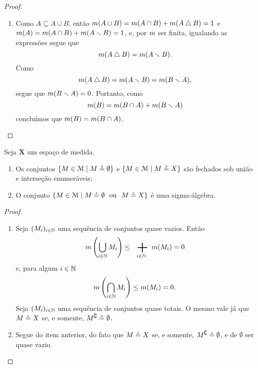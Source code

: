 \begin{proof}
\begin{enumerate}
\item Como $A \subseteq A \cup B$, então $m(A \cup B) = m(A \cap B) + m(A \mathbin{\triangle} B) = 1$ e $m(A) = m(A \cap B) + m(A \smallsetminus B) = 1$, e, por $m$ ser finita, igualando as expressões segue que
	\begin{equation*}
	m(A \mathbin{\triangle} B) = m(A \smallsetminus B).
	\end{equation*}
Como 
	\begin{equation*}
	m(A \mathbin{\triangle} B) = m(A \smallsetminus B) = m(B \smallsetminus A),
	\end{equation*}
segue que $m(B \smallsetminus A)=0$. Portanto, como
	\begin{equation*}
	m(B) = m(B \cap A) + m(B \smallsetminus A)
	\end{equation*}
concluímos que $m(B) = m(B \cap A)$.
	\end{enumerate}
\end{proof}

\begin{proposition}
Seja $\bm X$ um espaço de medida.
	\begin{enumerate}
	\item Os conjuntos $\left\{{M \in \mathcal{M}}\;\middle\vert\;{M \circeq \emptyset}\right\}$ e $\left\{{M \in \mathcal{M}}\;\middle\vert\;{M \circeq X}\right\}$ são fechados sob união e interseção enumeráveis;
	\item O conjunto $\left\{{M \in \mathcal{M}}\;\middle\vert\;{M \circeq \emptyset \text{\ \ ou\ \ } M \circeq X}\right\}$ é uma sigma-álgebra.
	\end{enumerate}
\end{proposition}
\begin{proof}
	\begin{enumerate}
	\item Seja $(M_i)_{i \in \mathbb{N}}$ uma sequência de conjuntos quase vazios. Então
		\begin{equation*}
		\med\left( \bigcup_{i \in \N} M_i \right) \leq \sum_{i \in \N} \med(M_i) = 0
		\end{equation*}
e, para algum $i \in \mathbb{N}$
		\begin{equation*}
		m\left( \bigcap_{i \in \mathbb{N}} M_i \right) \leq m(M_i) = 0.
		\end{equation*}
Seja $(M_i)_{i \in \mathbb{N}}$ uma sequência de conjuntos quase totais. O mesmo vale já que $M \circeq X$ se, e somente, $M^\complement \circeq \emptyset$.
	\item Segue do item anterior, do fato que $M \circeq X$ se, e somente, $M^\complement \circeq \emptyset$, e de $\emptyset$ ser quase vazio.
	\end{enumerate}
\end{proof}


